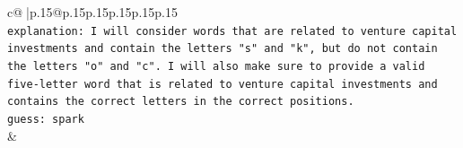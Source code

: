 \documentclass{article}
\begin{document}
{\begin{supertabular}{c@{$\;$}|p{.15\linewidth}@{}p{.15\linewidth}p{.15\linewidth}p{.15\linewidth}p{.15\linewidth}p{.15\linewidth}}
{{{\\ 
\texttt{explanation: I will consider words that are related to venture capital investments and contain the letters "s" and "k", but do not contain the letters "o" and "c". I will also make sure to provide a valid five{-}letter word that is related to venture capital investments and contains the correct letters in the correct positions.} \\
\texttt{guess: spark} \\
            }
        }
    }
    & \\ \\

\end{supertabular}
}
\end{document}
